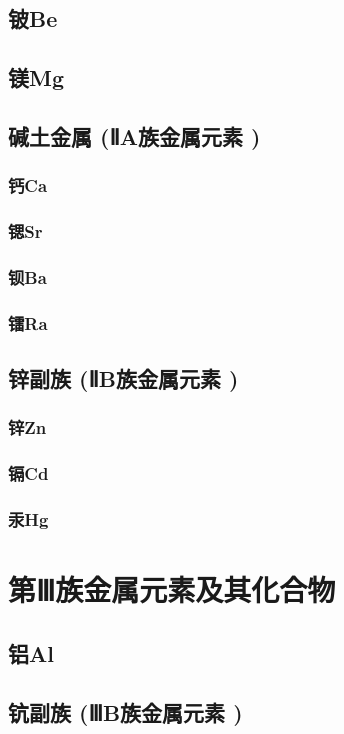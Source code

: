 \documentclass[UTF8]{../03-Chemistry}
\begin{document}
    \subsection{铍Be}
    \subsection{镁Mg}
    \subsection{碱土金属 (ⅡA族金属元素 )}
        \subsubsection{钙Ca}
        \subsubsection{锶Sr}
        \subsubsection{钡Ba}
        \subsubsection{镭Ra}
    \subsection{锌副族 (ⅡB族金属元素 )}
        \subsubsection{锌Zn}
        \subsubsection{镉Cd}
        \subsubsection{汞Hg}

\section{第Ⅲ族金属元素及其化合物}
    \subsection{铝Al}
    \subsection{钪副族 (ⅢB族金属元素 )}
\end{document}

